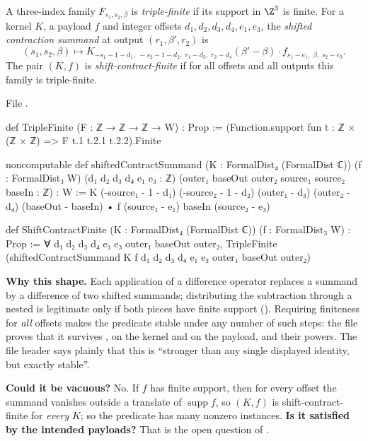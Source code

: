 \begin{definition}\label{l01:def:shiftfinite}
A three-index family $F_{s_1,s_2,\beta}$ is \emph{triple-finite} if its support in $\Z^3$ is finite. For a kernel $K$, a payload
$f$ and integer offsets $d_1,d_2,d_3,d_4,e_1,e_3$, the \emph{shifted contraction summand} at output $(r_1,\beta',r_2)$ is
\begin{equation*}
  (s_1,s_2,\beta)\longmapsto K_{-s_1-1-d_1,\;-s_2-1-d_2,\;r_1-d_3,\;r_2-d_4}(\beta'-\beta)\cdot f_{s_1-e_1,\;\beta,\;s_2-e_3}.
\end{equation*}
The pair $(K,f)$ is \emph{shift-contract-finite} if for all offsets and all outputs this family is triple-finite.
\end{definition}

\noindent File .
\begin{leancode}
def TripleFinite (F : ℤ → ℤ → ℤ → W) : Prop :=
  (Function.support fun t : ℤ × (ℤ × ℤ) => F t.1 t.2.1 t.2.2).Finite

noncomputable def shiftedContractSummand (K : FormalDist₄ (FormalDist ℂ))
    (f : FormalDist₃ W) (d₁ d₂ d₃ d₄ e₁ e₃ : ℤ)
    (outer₁ baseOut outer₂ source₁ source₂ baseIn : ℤ) : W :=
  K (-source₁ - 1 - d₁) (-source₂ - 1 - d₂)
      (outer₁ - d₃) (outer₂ - d₄) (baseOut - baseIn) •
    f (source₁ - e₁) baseIn (source₂ - e₃)

def ShiftContractFinite (K : FormalDist₄ (FormalDist ℂ)) (f : FormalDist₃ W) : Prop :=
  ∀ d₁ d₂ d₃ d₄ e₁ e₃ outer₁ baseOut outer₂,
    TripleFinite (shiftedContractSummand K f d₁ d₂ d₃ d₄ e₁ e₃
      outer₁ baseOut outer₂)
\end{leancode}

\begin{dictionary}
\textbf{Why this shape.} Each application of a difference operator replaces a summand by a difference of two shifted
summands; distributing the subtraction through a nested  is legitimate only if both pieces have finite
support (). Requiring finiteness for \emph{all} offsets makes the predicate stable under
any number of such steps: the file proves that it survives ,  on the
kernel and  on the payload, and their powers. The file header says plainly that this is ``stronger than any
single displayed identity, but exactly stable''.

\textbf{Could it be vacuous?} No. If $f$ has finite support, then for every offset the summand vanishes outside a
translate of $\operatorname{supp}f$, so $(K,f)$ is shift-contract-finite for \emph{every} $K$; so the predicate has many
nonzero instances. \textbf{Is it satisfied by the intended payloads?} That is the open question of
.
\end{dictionary}

